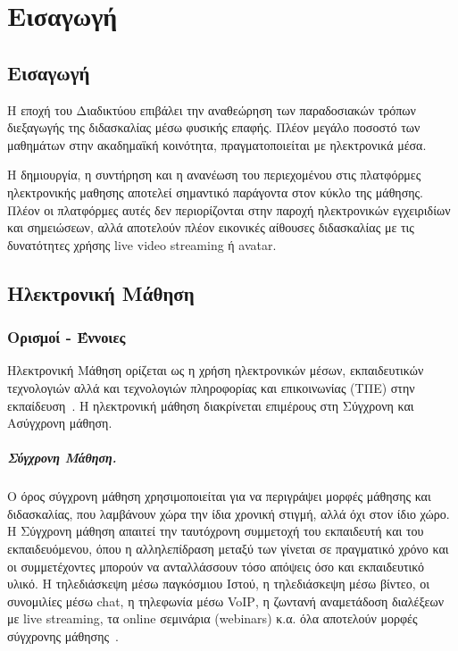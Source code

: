 \documentclass[12pt]{report}
\begin{document}
\hypersetup{pageanchor=true}
\clearpage
{}

\chapter{Εισαγωγή}\label{ch1}
\section{Εισαγωγή}
Η εποχή του Διαδικτύου επιβάλει την αναθεώρηση των παραδοσιακών τρόπων διεξαγωγής της διδασκαλίας μέσω φυσικής επαφής. Πλέον μεγάλο ποσοστό των μαθημάτων στην ακαδημαϊκή κοινότητα, πραγματοποιείται με ηλεκτρονικά μέσα.

Η δημιουργία, η συντήρηση και η ανανέωση του περιεχομένου στις πλατφόρμες ηλεκτρονικής μαθησης αποτελεί σημαντικό παράγοντα στον κύκλο της μάθησης. Πλέον οι πλατφόρμες αυτές δεν περιορίζονται στην παροχή ηλεκτρονικών εγχειριδίων και σημειώσεων, αλλά αποτελούν πλέον εικονικές αίθουσες διδασκαλίας με τις δυνατότητες χρήσης \textlatin{live video streaming} ή \textlatin{avatar}.

\section{Ηλεκτρονική Μάθηση}
\subsection{Ορισμοί - Έννοιες}
Ηλεκτρονική Μάθηση ορίζεται ως η χρήση ηλεκτρονικών μέσων, εκπαιδευτικών τεχνολογιών αλλά και τεχνολογιών πληροφορίας και επικοινωνίας (ΤΠΕ) στην εκπαίδευση~\cite{wikipedia_2018_1}. Η ηλεκτρονική μάθηση διακρίνεται επιμέρους στη Σύγχρονη και Ασύγχρονη μάθηση.
  \paragraph{Σύγχρονη Mάθηση.} Ο όρος σύγχρονη μάθηση χρησιμοποιείται για να περιγράψει μορφές μάθησης και διδασκαλίας, που λαμβάνουν χώρα την ίδια χρονική στιγμή, αλλά όχι στον ίδιο χώρο. Η Σύγχρονη μάθηση απαιτεί την ταυτόχρονη συμμετοχή του εκπαιδευτή και του εκπαιδευόμενου, όπου η αλληλεπίδραση μεταξύ των γίνεται σε πραγματικό χρόνο και οι συμμετέχοντες μπορούν να ανταλλάσσουν τόσο απόψεις όσο και εκπαιδευτικό υλικό. Η τηλεδιάσκεψη μέσω παγκόσμιου Ιστού, η τηλεδιάσκεψη μέσω βίντεο, οι συνομιλίες μέσω \textlatin{chat}, η τηλεφωνία μέσω \textlatin{VoIP}, η ζωντανή αναμετάδοση διαλέξεων με \textlatin{live streaming}, τα \textlatin{online} σεμινάρια (\textlatin{webinars}) κ.α. όλα αποτελούν μορφές σύγχρονης μάθησης~\cite{moore_kearsley_2005}.
\end{document}
